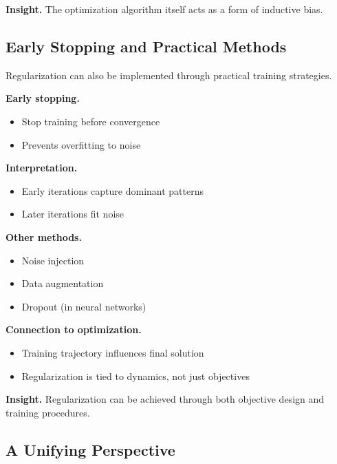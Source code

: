 \noindent
\textbf{Insight.}  
The optimization algorithm itself acts as a form of inductive bias.

\subsection{Early Stopping and Practical Methods}

Regularization can also be implemented through practical training strategies.

\medskip

\noindent
\textbf{Early stopping.}
\begin{itemize}
    \item Stop training before convergence
    \item Prevents overfitting to noise
\end{itemize}

\medskip

\noindent
\textbf{Interpretation.}
\begin{itemize}
    \item Early iterations capture dominant patterns
    \item Later iterations fit noise
\end{itemize}

\medskip

\noindent
\textbf{Other methods.}
\begin{itemize}
    \item Noise injection
    \item Data augmentation
    \item Dropout (in neural networks)
\end{itemize}

\medskip

\noindent
\textbf{Connection to optimization.}
\begin{itemize}
    \item Training trajectory influences final solution
    \item Regularization is tied to dynamics, not just objectives
\end{itemize}

\medskip

\noindent
\textbf{Insight.}  
Regularization can be achieved through both objective design and training procedures.

\subsection{A Unifying Perspective}

